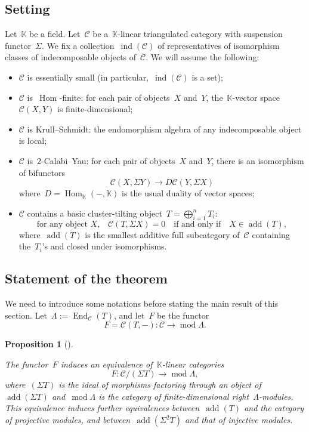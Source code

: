 \documentclass{amsart}
\newtheorem{proposition}[theorem]{Proposition}
\theoremstyle{definition}
\newcommand{\field}{\mathbb{K}}
\newcommand{\cat}{\mathcal{C}}
\newcommand{\Hom}[1]{\operatorname{Hom}_{#1}}
\newcommand{\susp}{\Sigma}
\newcommand{\add}{\operatorname{add}}
\newcommand{\MOD}{\operatorname{mod}}
\newcommand{\End}[1]{\operatorname{End}_{#1}}
\newcommand{\ind}{\operatorname{ind}}
\begin{document}
\subsection{Setting}\label{sect::setting}
Let~$\field$ be a field.  Let~$\cat$ be a~$\field$-linear triangulated category with suspension functor~$\susp$.  We fix a collection~$\ind(\cat)$ of representatives of isomorphism classes of indecomposable objects of~$\cat$. We will assume the following:
\begin{itemize}
 \item $\cat$ is essentially small (in particular,~$\ind(\cat)$ is a set);
 \item $\cat$ is~$\Hom{}$-finite: for each pair of objects~$X$ and~$Y$, the~$\field$-vector space~$\cat(X,Y)$ is finite-dimensional;
 \item $\cat$ is Krull--Schmidt: the endomorphism algebra of any indecomposable object is local;
 \item $\cat$ is~$2$-Calabi--Yau: for each pair of objects~$X$ and~$Y$, there is an isomorphism of bifunctors
 \[
  \cat(X,\susp Y) \to D\cat(Y,\susp X)
 \]
 where~$D=\Hom{\field}(-,\field)$ is the usual duality of vector spaces;
 \item $\cat$ contains a basic cluster-tilting object~$T=\bigoplus_{i=1}^n T_i$:
 \[
  \textrm{for any object~$X$,} \quad \cat(T, \susp X) = 0 \quad \textrm{if and only if} \quad X\in \add(T),
 \]
 where~$\add(T)$ is the smallest additive full subcategory of~$\cat$ containing the~$T_i$'s and closed under isomorphisms.
\end{itemize}


\subsection{Statement of the theorem}
We need to introduce some notations before stating the main result of this section.  Let~$\Lambda:= \End{\cat}(T)$, and let~$F$ be the functor
\[
 F=\cat(T,-):\cat \xrightarrow{} \MOD \Lambda.
\]

\begin{proposition}[\cite{BuanMarshReiten, KellerReiten}]\label{prop::functor-F}

The functor~$F$ induces an equivalence of~$\field$-linear categories
 \[
  F:\cat/(\susp T) \xrightarrow{} \MOD \Lambda,
 \]
 where~$(\susp T)$ is the ideal of morphisms factoring through an object of~$\add(\susp T)$ and~$\MOD \Lambda$ is the category of finite-dimensional right~$\Lambda$-modules.  This equivalence induces further equivalences between~$\add(T)$ and the category of projective modules, and between~$\add(\susp^2 T)$ and that of injective modules.
\end{proposition}
\end{document}
